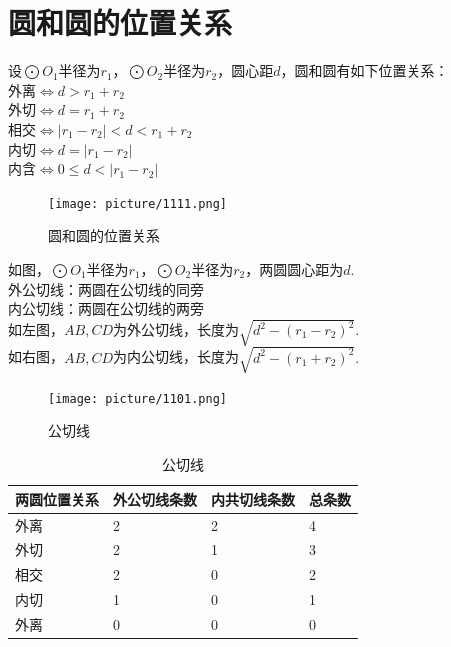 \documentclass{ecnuthesis}
\begin{document}
\section{圆和圆的位置关系}
\begin{knowledge}
    设$\bigodot O_1$半径为$r_1$，$\bigodot O_2$半径为$r_2$，圆心距$d$，圆和圆有如下位置关系： \\
    外离$\Leftrightarrow d > r_1+r_2$ \\
    外切$\Leftrightarrow d = r_1+r_2$ \\
    相交$\Leftrightarrow |r_1-r_2|<d < r_1+r_2$ \\
    内切$\Leftrightarrow d = |r_1-r_2|$ \\
    内含$\Leftrightarrow 0 \le d < |r_1-r_2|$
\end{knowledge}
\begin{figure}[H]
\centering
\texttt{[image: picture/1111.png]}
\caption{圆和圆的位置关系}
\end{figure}
\begin{knowledge}
    如图，$\bigodot O_1$半径为$r_1$，$\bigodot O_2$半径为$r_2$，两圆圆心距为$d$. \\
    外公切线：两圆在公切线的同旁 \\
    内公切线：两圆在公切线的两旁 \\
    如左图，$AB,CD$为外公切线，长度为$\sqrt{d^2-(r_1-r_2)^2}.$ \\
    如右图，$AB,CD$为内公切线，长度为$\sqrt{d^2-(r_1+r_2)^2}.$
\end{knowledge}
\begin{figure}[H]
\centering
\texttt{[image: picture/1101.png]}
\caption{公切线}
\end{figure}
\begin{table}[H]
\centering
\caption{公切线}
\begin{tabular}{l|l|l|l}
\hline
\hline
两圆位置关系 & 外公切线条数 & 内共切线条数 & 总条数 \\
\hline
外离 & 2 & 2 & 4 \\
外切 & 2 & 1 & 3 \\
相交 & 2 & 0 & 2 \\
内切 & 1 & 0 & 1 \\
外离 & 0 & 0 & 0 \\
\hline
\hline
\end{tabular}
\end{table}
\clearpage
\end{document}
